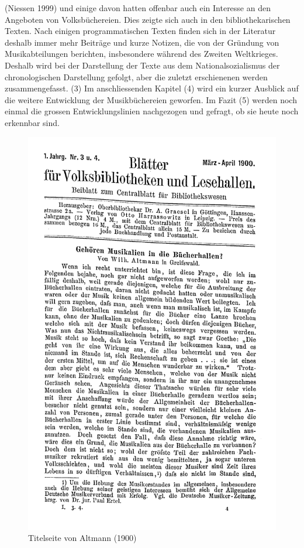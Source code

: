\documentclass[a4paper,
fontsize=11pt,
oneside,
numbers=noperiodatend,
parskip=half-,
bibliography=totoc,
final
]{scrartcl}
\begin{document}
(Niessen 1999) und einige davon hatten offenbar auch ein Interesse an
den Angeboten von Volksbüchereien. Dies zeigte sich auch in den
bibliothekarischen Texten. Nach einigen programmatischen Texten finden
sich in der Literatur deshalb immer mehr Beiträge und kurze Notizen, die
von der Gründung von Musikabteilungen berichten, insbesondere während
des Zweiten Weltkrieges. Deshalb wird bei der Darstellung der Texte aus
dem Nationalsozialismus der chronologischen Darstellung gefolgt, aber
die zuletzt erschienenen werden zusammengefasst. (3) Im anschliessenden
Kapitel (4) wird ein kurzer Ausblick auf die weitere Entwicklung der
Musikbüchereien geworfen. Im Fazit (5) werden noch einmal die grossen
Entwicklungslinien nachgezogen und gefragt, ob sie heute noch erkennbar
sind.

\begin{figure}
\centering
\includegraphics{files/Altmann_1900.jpg}
\caption{Titelseite von Altmann (1900)}
\end{figure}
\end{document}

